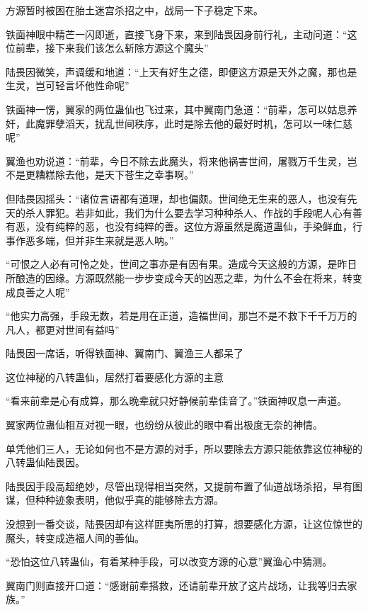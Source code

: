 
\begin{this_body}

方源暂时被困在胎土迷宫杀招之中，战局一下子稳定下来。

铁面神眼中精芒一闪即逝，直接飞身下来，来到陆畏因身前行礼，主动问道：“这位前辈，接下来我们该怎么斩除方源这个魔头”

陆畏因微笑，声调缓和地道：“上天有好生之德，即便这方源是天外之魔，那也是生灵，岂可轻言坏他性命呢”

铁面神一愣，翼家的两位蛊仙也飞过来，其中翼南门急道：“前辈，怎可以姑息养奸，此魔罪孽滔天，扰乱世间秩序，此时是除去他的最好时机，怎可以一味仁慈呢”

翼渔也劝说道：“前辈，今日不除去此魔头，将来他祸害世间，屠戮万千生灵，岂不是更糟糕除去他，是天下苍生之幸事啊。”

但陆畏因摇头：“诸位言语都有道理，却也偏颇。世间绝无生来的恶人，也没有先天的杀人罪犯。若非如此，我们为什么要去学习种种杀人、作战的手段呢人心有善有恶，没有纯粹的恶，也没有纯粹的善。这位方源虽然是魔道蛊仙，手染鲜血，行事作恶多端，但并非生来就是恶人呐。”

“可恨之人必有可怜之处，世间之事亦是有因有果。造成今天这般的方源，是昨日所酿造的因缘。方源既然能一步步变成今天的凶恶之辈，为什么不会在将来，转变成良善之人呢”

“他实力高强，手段无数，若是用在正道，造福世间，那岂不是不救下千千万万的凡人，都更对世间有益吗”

陆畏因一席话，听得铁面神、翼南门、翼渔三人都呆了

这位神秘的八转蛊仙，居然打着要感化方源的主意

“看来前辈是心有成算，那么晚辈就只好静候前辈佳音了。”铁面神叹息一声道。

翼家两位蛊仙相互对视一眼，也纷纷从彼此的眼中看出极度无奈的神情。

单凭他们三人，无论如何也不是方源的对手，所以要除去方源只能依靠这位神秘的八转蛊仙陆畏因。

陆畏因手段高超绝妙，尽管出现得相当突然，又提前布置了仙道战场杀招，早有图谋，但种种迹象表明，他似乎真的能够除去方源。

没想到一番交谈，陆畏因却有这样匪夷所思的打算，想要感化方源，让这位惊世的魔头，转变成造福人间的善仙。

“恐怕这位八转蛊仙，有着某种手段，可以改变方源的心意”翼渔心中猜测。

翼南门则直接开口道：“感谢前辈搭救，还请前辈开放了这片战场，让我等归去家族。”


\end{this_body}
